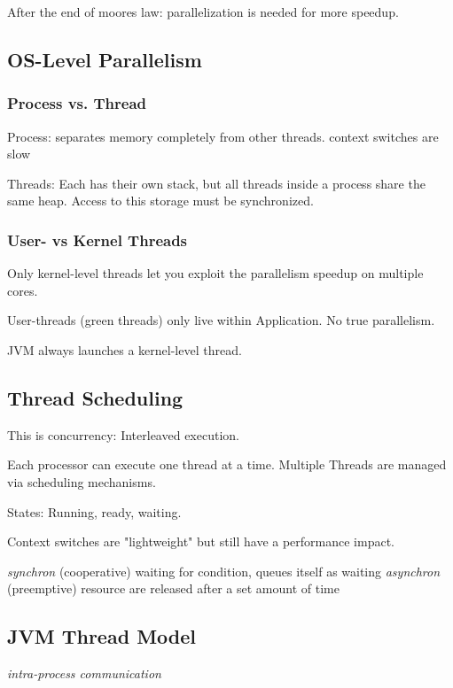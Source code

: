 After the end of moores law: parallelization is needed for more speedup.

\subsection{OS-Level Parallelism}

\subsubsection{Process vs. Thread}

Process: separates memory completely from other threads. context switches are slow

Threads: Each has their own stack, but all threads inside a process share the same heap. Access to this storage must be synchronized.

\subsubsection{User- vs Kernel Threads}

Only kernel-level threads let you exploit the parallelism speedup on multiple cores.

User-threads (green threads) only live within Application. No true parallelism.

JVM always launches a kernel-level thread.

\subsection{Thread Scheduling}

This is concurrency: Interleaved execution.

Each processor can execute one thread at a time. Multiple Threads are managed via scheduling mechanisms.

States: Running, ready, waiting.

Context switches are "lightweight" but still have a performance impact.

\emph{synchron} (cooperative) waiting for condition, queues itself as waiting
\emph{asynchron} (preemptive) resource are released after a set amount of time

\subsection{JVM Thread Model}

\emph{intra-process communication}

